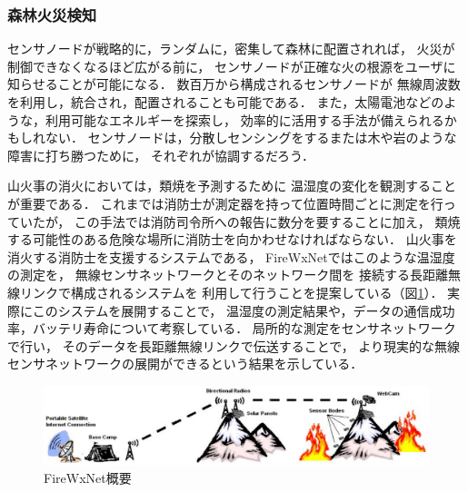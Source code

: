 \subsubsection{森林火災検知}

\vspace{0.5em}センサノードが戦略的に，ランダムに，密集して森林に配置されれば，
火災が制御できなくなるほど広がる前に，
センサノードが正確な火の根源をユーザに知らせることが可能になる．
数百万から構成されるセンサノードが
無線周波数を利用し，統合され，配置されることも可能である．
また，太陽電池などのような，利用可能なエネルギーを探索し，
効率的に活用する手法が備えられるかもしれない．
センサノードは，分散しセンシングをするまたは木や岩のような障害に打ち勝つために，
それぞれが協調するだろう．


山火事の消火においては，類焼を予測するために
温湿度の変化を観測することが重要である．
これまでは消防士が測定器を持って位置時間ごとに測定を行っていたが，
この手法では消防司令所への報告に数分を要することに加え，
類焼する可能性のある危険な場所に消防士を向かわせなければならない．
山火事を消火する消防士を支援するシステムである，
FireWxNet\cite{conf/mobisys/HartungHSH06}ではこのような温湿度の測定を，
無線センサネットワークとそのネットワーク間を
接続する長距離無線リンクで構成されるシステムを
利用して行うことを提案している（図\ref{fig:firewxnet_overview}）．
実際にこのシステムを展開することで，
温湿度の測定結果や，データの通信成功率，バッテリ寿命について考察している．
局所的な測定をセンサネットワークで行い，
そのデータを長距離無線リンクで伝送することで，
より現実的な無線センサネットワークの展開ができるという結果を示している．

\begin{figure}[htbp]
 \begin{center}
  \includegraphics[width=140mm]{./images/firewxnet_overview.eps}
 \end{center}
 \caption{FireWxNet概要}
 \label{fig:firewxnet_overview}
\end{figure}




